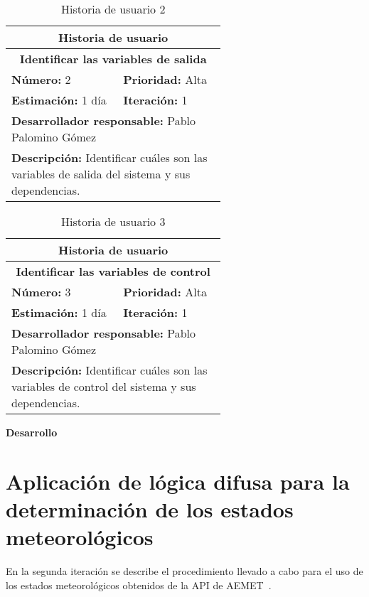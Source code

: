 \begin{table}[H]
        \centering
        \begin{tabular}{|p{0.3\linewidth}|p{0.3\linewidth}|}
          \hline
          \multicolumn{2}{|c|}{Historia de usuario}\\ \hline
          \multicolumn{2}{|c|}{\textbf{Identificar las variables de salida}}\\ \hline
          \textbf{Número:} 2 & \textbf{Prioridad:} Alta\\ \hline
          \textbf{Estimación:} 1 día & \textbf{Iteración:} 1\\ \hline
          \multicolumn{2}{|l|}{\textbf{Desarrollador responsable:} Pablo Palomino Gómez}\\ \hline
          \multicolumn{2}{|p{0.6\linewidth}|}{\textbf{Descripción:} Identificar cuáles son las variables de salida del sistema y sus dependencias.}\\ \hline
        \end{tabular}
        \caption{Historia de usuario 2}
        \label{tab:hist2}
\end{table}
\begin{table}[H]
        \centering
        \begin{tabular}{|p{0.3\linewidth}|p{0.3\linewidth}|}
          \hline
          \multicolumn{2}{|c|}{Historia de usuario}\\ \hline
          \multicolumn{2}{|c|}{\textbf{Identificar las variables de control}}\\ \hline
          \textbf{Número:} 3 & \textbf{Prioridad:} Alta\\ \hline
          \textbf{Estimación:} 1 día & \textbf{Iteración:} 1\\ \hline
          \multicolumn{2}{|l|}{\textbf{Desarrollador responsable:} Pablo Palomino Gómez}\\ \hline
          \multicolumn{2}{|p{0.6\linewidth}|}{\textbf{Descripción:} Identificar cuáles son las variables de control del sistema y sus dependencias.}\\ \hline
        \end{tabular}
        \caption{Historia de usuario 3}
        \label{tab:hist3}
\end{table}
\textbf{Desarrollo}\\


\section{Aplicación de lógica difusa para la determinación de los estados meteorológicos}
\label{sec:hito2}
En la segunda iteración se describe el procedimiento llevado a cabo para el uso de los estados meteorológicos obtenidos de la \gls{API} de \gls{AEMET}~\cite{Aemet}.\\

